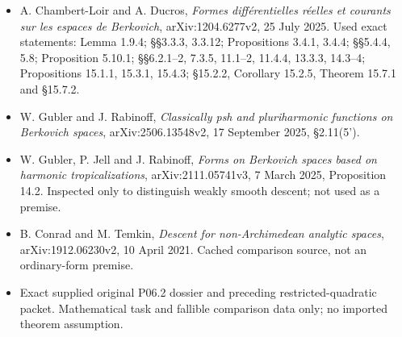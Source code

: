 \documentclass[
  11pt,
]{article}
\providecommand{\tightlist}{%
  \setlength{\itemsep}{0pt}\setlength{\parskip}{0pt}}
\begin{document}
\begin{itemize}
\tightlist
\item
  A. Chambert-Loir and A. Ducros, \emph{Formes différentielles réelles
  et courants sur les espaces de Berkovich}, arXiv:1204.6277v2, 25 July
  2025. Used exact statements: Lemma 1.9.4; §§3.3.3, 3.3.12;
  Propositions 3.4.1, 3.4.4; §§5.4.4, 5.8; Proposition 5.10.1;
  §§6.2.1--2, 7.3.5, 11.1--2, 11.4.4, 13.3.3, 14.3--4; Propositions
  15.1.1, 15.3.1, 15.4.3; §15.2.2, Corollary 15.2.5, Theorem 15.7.1 and
  §15.7.2.
\item
  W. Gubler and J. Rabinoff, \emph{Classically psh and pluriharmonic
  functions on Berkovich spaces}, arXiv:2506.13548v2, 17 September 2025,
  §2.11(5').
\item
  W. Gubler, P. Jell and J. Rabinoff, \emph{Forms on Berkovich spaces
  based on harmonic tropicalizations}, arXiv:2111.05741v3, 7 March 2025,
  Proposition 14.2. Inspected only to distinguish weakly smooth descent;
  not used as a premise.
\item
  B. Conrad and M. Temkin, \emph{Descent for non-Archimedean analytic
  spaces}, arXiv:1912.06230v2, 10 April 2021. Cached comparison source,
  not an ordinary-form premise.
\item
  Exact supplied original P06.2 dossier and preceding
  restricted-quadratic packet. Mathematical task and fallible comparison
  data only; no imported theorem assumption.
\end{itemize}
\end{document}

